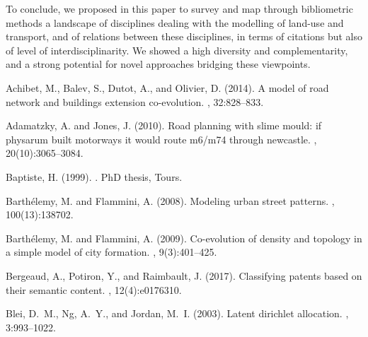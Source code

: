 \documentclass[10pt]{article}
\begin{document}
To conclude, we proposed in this paper to survey and map through bibliometric methods a landscape of disciplines dealing with the modelling of land-use and transport, and of relations between these disciplines, in terms of citations but also of level of interdisciplinarity. We showed a high diversity and complementarity, and a strong potential for novel approaches bridging these viewpoints.







%
%
%

\begin{thebibliography}{}

Achibet, M., Balev, S., Dutot, A., and Olivier, D. (2014).
\newblock A model of road network and buildings extension co-evolution.
, 32:828--833.

Adamatzky, A. and Jones, J. (2010).
\newblock Road planning with slime mould: if physarum built motorways it would
  route m6/m74 through newcastle.
,
  20(10):3065--3084.

Baptiste, H. (1999).
.
\newblock PhD thesis, Tours.

Barth{\'e}lemy, M. and Flammini, A. (2008).
\newblock Modeling urban street patterns.
, 100(13):138702.

Barth{\'e}lemy, M. and Flammini, A. (2009).
\newblock Co-evolution of density and topology in a simple model of city
  formation.
, 9(3):401--425.

Bergeaud, A., Potiron, Y., and Raimbault, J. (2017).
\newblock Classifying patents based on their semantic content.
, 12(4):e0176310.

Blei, D.~M., Ng, A.~Y., and Jordan, M.~I. (2003).
\newblock Latent dirichlet allocation.
, 3:993--1022.


\end{thebibliography}
\end{document}
